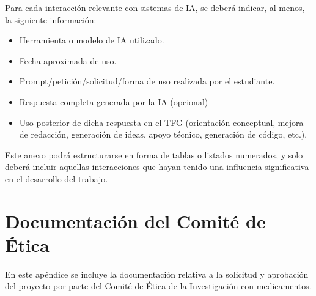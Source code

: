 \documentclass[
  spanish,
  a4paper,
  12pt,
  twoside]{memoir}
\newcommand{\apendice}[1]{\chapter{#1}}
\begin{document}
Para cada interacción relevante con sistemas de IA, se deberá indicar,
al menos, la siguiente información:

\begin{itemize}
    \item Herramienta o modelo de IA utilizado.
    \item Fecha aproximada de uso.
    \item Prompt/petición/solicitud/forma de uso realizada por el estudiante.
    \item Respuesta completa generada por la IA (opcional)
    \item Uso posterior de dicha respuesta en el TFG (orientación conceptual,
    mejora de redacción, generación de ideas, apoyo técnico, generación de código, etc.).
\end{itemize}

Este anexo podrá estructurarse en forma de tablas o listados numerados,
y solo deberá incluir aquellas interacciones que hayan tenido una
influencia significativa en el desarrollo del trabajo.


\apendice{Documentación del Comité de Ética}

En este apéndice se incluye la documentación relativa a la solicitud y
aprobación del proyecto por parte del Comité de Ética de la
Investigación con medicamentos.

\clearpage


\clearpage



\backmatter

\end{document}
